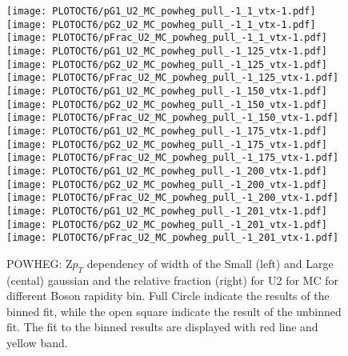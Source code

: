 \documentclass[41pt,a4paper,oneside]{report}
\begin{document}
\begin{figure}[h!]
  \begin{center}
    \texttt{[image: PLOTOCT6/pG1\_U2\_MC\_powheg\_pull\_-1\_1\_vtx-1.pdf]}
    \texttt{[image: PLOTOCT6/pG2\_U2\_MC\_powheg\_pull\_-1\_1\_vtx-1.pdf]}
    \texttt{[image: PLOTOCT6/pFrac\_U2\_MC\_powheg\_pull\_-1\_1\_vtx-1.pdf]} 
    \texttt{[image: PLOTOCT6/pG1\_U2\_MC\_powheg\_pull\_-1\_125\_vtx-1.pdf]}
    \texttt{[image: PLOTOCT6/pG2\_U2\_MC\_powheg\_pull\_-1\_125\_vtx-1.pdf]}
    \texttt{[image: PLOTOCT6/pFrac\_U2\_MC\_powheg\_pull\_-1\_125\_vtx-1.pdf]} 
    \texttt{[image: PLOTOCT6/pG1\_U2\_MC\_powheg\_pull\_-1\_150\_vtx-1.pdf]}
    \texttt{[image: PLOTOCT6/pG2\_U2\_MC\_powheg\_pull\_-1\_150\_vtx-1.pdf]}
    \texttt{[image: PLOTOCT6/pFrac\_U2\_MC\_powheg\_pull\_-1\_150\_vtx-1.pdf]} 
    \texttt{[image: PLOTOCT6/pG1\_U2\_MC\_powheg\_pull\_-1\_175\_vtx-1.pdf]}
    \texttt{[image: PLOTOCT6/pG2\_U2\_MC\_powheg\_pull\_-1\_175\_vtx-1.pdf]}
    \texttt{[image: PLOTOCT6/pFrac\_U2\_MC\_powheg\_pull\_-1\_175\_vtx-1.pdf]} 
    \texttt{[image: PLOTOCT6/pG1\_U2\_MC\_powheg\_pull\_-1\_200\_vtx-1.pdf]}
    \texttt{[image: PLOTOCT6/pG2\_U2\_MC\_powheg\_pull\_-1\_200\_vtx-1.pdf]}
    \texttt{[image: PLOTOCT6/pFrac\_U2\_MC\_powheg\_pull\_-1\_200\_vtx-1.pdf]} 
    \texttt{[image: PLOTOCT6/pG1\_U2\_MC\_powheg\_pull\_-1\_201\_vtx-1.pdf]}
    \texttt{[image: PLOTOCT6/pG2\_U2\_MC\_powheg\_pull\_-1\_201\_vtx-1.pdf]}
    \texttt{[image: PLOTOCT6/pFrac\_U2\_MC\_powheg\_pull\_-1\_201\_vtx-1.pdf]} 
    \caption{POWHEG: Z$p_{T}$ dependency of width of the Small (left) and Large (cental) gaussian and the relative fraction (right) for U2 for MC for different Boson rapidity bin. Full Circle indicate the results of the binned fit, while the open square indicate the result of the unbinned fit. The fit to the binned results are displayed with red line and yellow band.
\newline
}
    \label{fig:SmallLargeU2POW}
  \end{center}
\end{figure}
\end{document}
